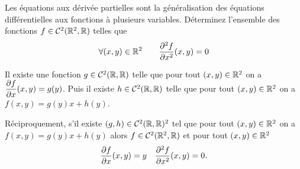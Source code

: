 Les équations aux dérivée partielles sont la généralisation des 
équations différentielles aux fonctions à plusieurs variables. Déterminez 
l'ensemble des fonctions \(f \in \mathcal{C}^{2}(\mathbb{R}^2, \mathbb{R})\) telles que
\begin{equation}
  \forall (x,y) \in \mathbb{R}^2 \qquad \dfrac{\partial{}^2 f}{\partial{} {x}^2}(x, y) = 0
\end{equation}

Il existe une fonction \(g \in \mathcal{C}^{2}(\mathbb{R}, \mathbb{R})\) telle que pour tout 
\((x, y) \in \mathbb{R}^2\) on a \(\dfrac{\partial{} f}{\partial{} x}(x, y)=g(y)\). Puis il existe 
\(h \in  \mathcal{C}^{2}(\mathbb{R}, \mathbb{R})\) telle que pour tout \((x, y) \in \mathbb{R}^2\) on 
a \(f(x, y) = g(y)x+h(y)\).

Réciproquement, s'il existe \((g, h) \in \mathcal{C}^{2}(\mathbb{R}, \mathbb{R})^2\) tel que 
pour tout \((x, y) \in \mathbb{R}^2\) on a \(f(x, y) = g(y)x+h(y)\) alors \(f 
\in \mathcal{C}^{2}(\mathbb{R}^2, \mathbb{R})\) et pour tout \((x, y) \in \mathbb{R}^2\)
\begin{equation}
  \dfrac{\partial{} f}{\partial{} x}(x,y)=y \quad   \dfrac{\partial{}^2 f}{\partial{} {x}^2}(x,y)=0.
\end{equation}

